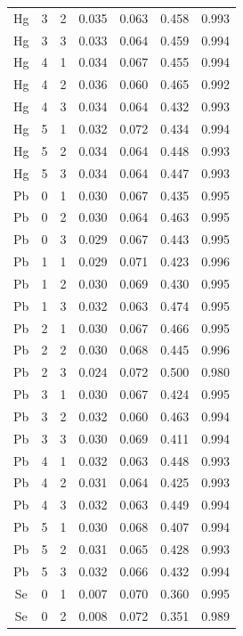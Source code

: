 \documentclass[ms, hidelinks]{uncgdissertationexp}
\theoremstyle{plain}
\theoremstyle{definition}
\theoremstyle{remark}
\begin{document}
\begin{longtable}{ccccccc}
\rowcolor{gray!6}  Hg & 3 & 2 & 0.035 & 0.063 & 0.458 & 0.993\\
Hg & 3 & 3 & 0.033 & 0.064 & 0.459 & 0.994\\
\rowcolor{gray!6}  Hg & 4 & 1 & 0.034 & 0.067 & 0.455 & 0.994\\
Hg & 4 & 2 & 0.036 & 0.060 & 0.465 & 0.992\\
\rowcolor{gray!6}  Hg & 4 & 3 & 0.034 & 0.064 & 0.432 & 0.993\\
Hg & 5 & 1 & 0.032 & 0.072 & 0.434 & 0.994\\
\rowcolor{gray!6}  Hg & 5 & 2 & 0.034 & 0.064 & 0.448 & 0.993\\
Hg & 5 & 3 & 0.034 & 0.064 & 0.447 & 0.993\\
\rowcolor{gray!6}  Pb & 0 & 1 & 0.030 & 0.067 & 0.435 & 0.995\\
Pb & 0 & 2 & 0.030 & 0.064 & 0.463 & 0.995\\
\rowcolor{gray!6}  Pb & 0 & 3 & 0.029 & 0.067 & 0.443 & 0.995\\
Pb & 1 & 1 & 0.029 & 0.071 & 0.423 & 0.996\\
\rowcolor{gray!6}  Pb & 1 & 2 & 0.030 & 0.069 & 0.430 & 0.995\\
Pb & 1 & 3 & 0.032 & 0.063 & 0.474 & 0.995\\
\rowcolor{gray!6}  Pb & 2 & 1 & 0.030 & 0.067 & 0.466 & 0.995\\
Pb & 2 & 2 & 0.030 & 0.068 & 0.445 & 0.996\\
\rowcolor{gray!6}  Pb & 2 & 3 & 0.024 & 0.072 & 0.500 & 0.980\\
Pb & 3 & 1 & 0.030 & 0.067 & 0.424 & 0.995\\
\rowcolor{gray!6}  Pb & 3 & 2 & 0.032 & 0.060 & 0.463 & 0.994\\
Pb & 3 & 3 & 0.030 & 0.069 & 0.411 & 0.994\\
\rowcolor{gray!6}  Pb & 4 & 1 & 0.032 & 0.063 & 0.448 & 0.993\\
Pb & 4 & 2 & 0.031 & 0.064 & 0.425 & 0.993\\
\rowcolor{gray!6}  Pb & 4 & 3 & 0.032 & 0.063 & 0.449 & 0.994\\
Pb & 5 & 1 & 0.030 & 0.068 & 0.407 & 0.994\\
\rowcolor{gray!6}  Pb & 5 & 2 & 0.031 & 0.065 & 0.428 & 0.993\\
Pb & 5 & 3 & 0.032 & 0.066 & 0.432 & 0.994\\
\rowcolor{gray!6}  Se & 0 & 1 & 0.007 & 0.070 & 0.360 & 0.995\\
Se & 0 & 2 & 0.008 & 0.072 & 0.351 & 0.989\\

\end{longtable}
\end{document}
